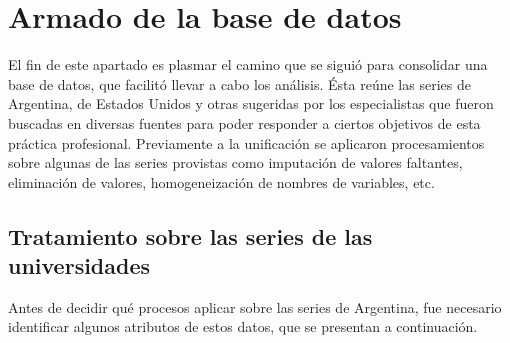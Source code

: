 \documentclass[12pt]{article}
\begin{document}
\newpage

\section{Armado de la base de datos}\label{armado-de-la-base-de-datos}

El fin de este apartado es plasmar el camino que se siguió para
consolidar una base de datos, que facilitó llevar a cabo los análisis.
Ésta reúne las series de Argentina, de Estados Unidos y otras sugeridas
por los especialistas que fueron buscadas en diversas fuentes para poder
responder a ciertos objetivos de esta práctica profesional. Previamente
a la unificación se aplicaron procesamientos sobre algunas de las series
provistas como imputación de valores faltantes, eliminación de valores,
homogeneización de nombres de variables, etc.

\subsection{Tratamiento sobre las series de las
universidades}\label{tratamiento-sobre-las-series-de-las-universidades}

Antes de decidir qué procesos aplicar sobre las series de Argentina, fue
necesario identificar algunos atributos de estos datos, que se presentan
a continuación.
\end{document}
